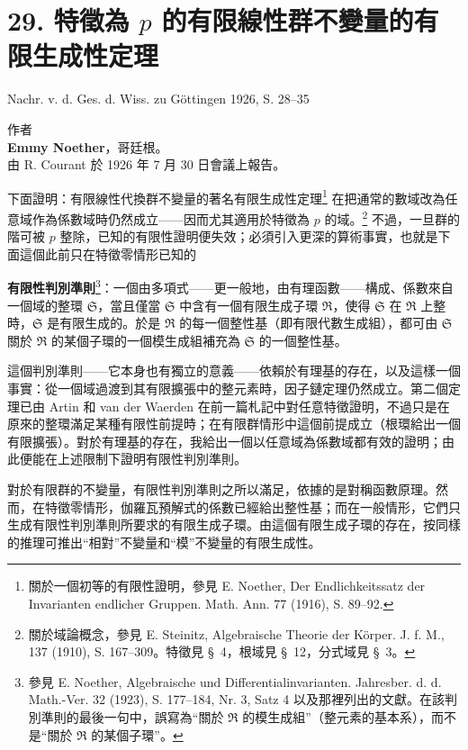 \documentclass[11pt]{article}
\newcommand{\srcemph}[1]{\textbf{#1}}
\begin{document}
\section*{29. 特徵為 $p$ 的有限線性群不變量的有限生成性定理}

\begin{center}
Nachr. v. d. Ges. d. Wiss. zu Göttingen 1926, S. 28--35
\end{center}

\setcounter{footnote}{0}

\begin{center}
作者\\[0.5em]
\textbf{Emmy Noether}，哥廷根。\\[1em]
由 R. Courant 於 1926 年 7 月 30 日會議上報告。
\end{center}

下面證明：有限線性代換群不變量的著名有限生成性定理\footnote{關於一個初等的有限性證明，參見 E. Noether, Der Endlichkeitssatz der Invarianten endlicher Gruppen. Math. Ann. 77 (1916), S. 89--92.} 在把通常的數域改為任意域作為係數域時仍然成立——因而尤其適用於特徵為 $p$ 的域。\footnote{關於域論概念，參見 E. Steinitz, Algebraische Theorie der Körper. J. f. M., 137 (1910), S. 167--309。特徵見 \S\ 4，根域見 \S\ 12，分式域見 \S\ 3。} 不過，一旦群的階可被 $p$ 整除，已知的有限性證明便失效；必須引入更深的算術事實，也就是下面這個此前只在特徵零情形已知的

\srcemph{有限性判別準則}\footnote{參見 E. Noether, Algebraische und Differentialinvarianten. Jahresber. d. d. Math.-Ver. 32 (1923), S. 177--184, Nr. 3, Satz 4 以及那裡列出的文獻。在該判別準則的最後一句中，誤寫為“關於 $\mathfrak R$ 的模生成組”（整元素的基本系），而不是“關於 $\mathfrak R$ 的某個子環”。}：一個由多項式——更一般地，由有理函數——構成、係數來自一個域的整環 $\mathfrak S$，當且僅當 $\mathfrak S$ 中含有一個有限生成子環 $\mathfrak R$，使得 $\mathfrak S$ 在 $\mathfrak R$ 上整時，$\mathfrak S$ 是有限生成的。於是 $\mathfrak R$ 的每一個整性基（即有限代數生成組），都可由 $\mathfrak S$ 關於 $\mathfrak R$ 的某個子環的一個模生成組補充為 $\mathfrak S$ 的一個整性基。

這個判別準則——它本身也有獨立的意義——依賴於有理基的存在，以及這樣一個事實：從一個域過渡到其有限擴張中的整元素時，因子鏈定理仍然成立。第二個定理已由 Artin 和 van der Waerden 在前一篇札記中對任意特徵證明，不過只是在原來的整環滿足某種有限性前提時；在有限群情形中這個前提成立（根環給出一個有限擴張）。對於有理基的存在，我給出一個以任意域為係數域都有效的證明；由此便能在上述限制下證明有限性判別準則。

對於有限群的不變量，有限性判別準則之所以滿足，依據的是對稱函數原理。然而，在特徵零情形，伽羅瓦預解式的係數已經給出整性基；而在一般情形，它們只生成有限性判別準則所要求的有限生成子環。由這個有限生成子環的存在，按同樣的推理可推出“相對”不變量和“模”不變量的有限生成性。
\end{document}
